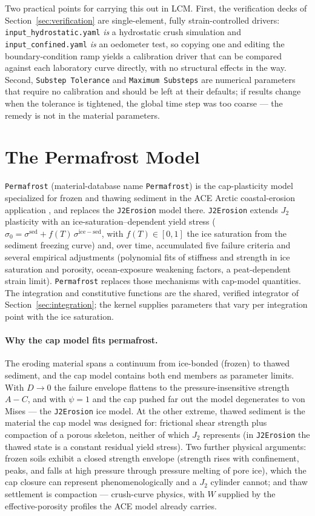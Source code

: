 \documentclass[12pt]{article}
\begin{document}
Two practical points for carrying this out in LCM. First, the
verification decks of Section~\ref{sec:verification} are
single-element, fully strain-controlled drivers:
\texttt{input\_hydrostatic.yaml} \emph{is} a hydrostatic crush
simulation and \texttt{input\_confined.yaml} \emph{is} an oedometer
test, so copying one and editing the boundary-condition ramp yields a
calibration driver that can be compared against each laboratory curve
directly, with no structural effects in the way. Second,
\texttt{Substep Tolerance} and \texttt{Maximum Substeps} are
numerical parameters that require no calibration and should be left
at their defaults; if results change when the tolerance is
tightened, the global time step was too coarse --- the remedy is not
in the material parameters.

\section{The Permafrost Model}
\label{sec:permafrost}

\texttt{Permafrost} (material-database name \texttt{Permafrost}) is
the cap-plasticity model specialized for frozen and thawing sediment
in the ACE Arctic coastal-erosion application
\citep{Frederick.etal:2021}, and replaces the \texttt{J2Erosion}
model there. \texttt{J2Erosion} extends $J_2$ plasticity with an
ice-saturation--dependent yield stress
($\sigma_0 = \sigma^{\mathrm{sed}} + f(T)\,
\sigma^{\mathrm{ice-sed}}$, with $f(T) \in [0,1]$ the ice saturation
from the sediment freezing curve) and, over time, accumulated five
failure criteria and several empirical adjustments (polynomial fits
of stiffness and strength in ice saturation and porosity,
ocean-exposure weakening factors, a peat-dependent strain limit).
\texttt{Permafrost} replaces those mechanisms with cap-model
quantities. The integration and constitutive functions are the
shared, verified integrator of Section~\ref{sec:integration}; the
kernel supplies parameters that vary per integration point with the
ice saturation.

\paragraph{Why the cap model fits permafrost.}
The eroding material spans a continuum from ice-bonded (frozen) to
thawed sediment, and the cap model contains both end members as
parameter limits. With $D \to 0$ the failure envelope flattens to
the pressure-insensitive strength $A - C$, and with $\psi = 1$ and
the cap pushed far out the model degenerates to von Mises --- the
\texttt{J2Erosion} ice model. At the other extreme, thawed sediment
is the material the cap model was designed for: frictional shear
strength plus compaction of a porous skeleton, neither of which
$J_2$ represents (in \texttt{J2Erosion} the thawed state is a
constant residual yield stress). Two further physical arguments:
frozen soils exhibit a closed strength envelope (strength rises with
confinement, peaks, and falls at high pressure through pressure
melting of pore ice), which the cap closure can represent
phenomenologically and a $J_2$ cylinder cannot; and thaw settlement
is compaction --- crush-curve physics, with $W$ supplied by the
effective-porosity profiles the ACE model already carries.
\end{document}
